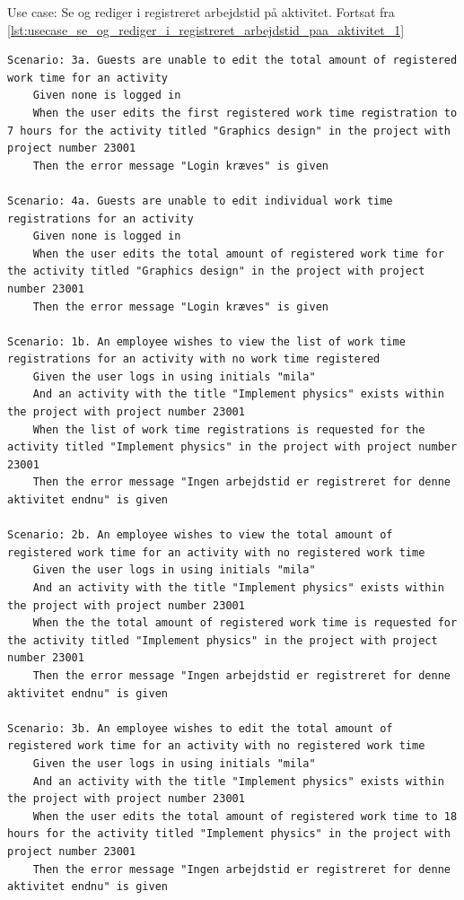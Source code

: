 \begin{listing}[H]
    \caption{Use case: Se og rediger i registreret arbejdstid på aktivitet. Fortsat fra \cref{lst:usecase_se_og_rediger_i_registreret_arbejdstid_paa_aktivitet_1}}\label{lst:usecase_se_og_rediger_i_registreret_arbejdstid_paa_aktivitet_2}
    \begin{verbatim}
Scenario: 3a. Guests are unable to edit the total amount of registered work time for an activity
    Given none is logged in
    When the user edits the first registered work time registration to 7 hours for the activity titled "Graphics design" in the project with project number 23001
    Then the error message "Login kræves" is given

Scenario: 4a. Guests are unable to edit individual work time registrations for an activity
    Given none is logged in
    When the user edits the total amount of registered work time for the activity titled "Graphics design" in the project with project number 23001
    Then the error message "Login kræves" is given

Scenario: 1b. An employee wishes to view the list of work time registrations for an activity with no work time registered
    Given the user logs in using initials "mila"
    And an activity with the title "Implement physics" exists within the project with project number 23001
    When the list of work time registrations is requested for the activity titled "Implement physics" in the project with project number 23001
    Then the error message "Ingen arbejdstid er registreret for denne aktivitet endnu" is given

Scenario: 2b. An employee wishes to view the total amount of registered work time for an activity with no registered work time
    Given the user logs in using initials "mila"
    And an activity with the title "Implement physics" exists within the project with project number 23001
    When the the total amount of registered work time is requested for the activity titled "Implement physics" in the project with project number 23001
    Then the error message "Ingen arbejdstid er registreret for denne aktivitet endnu" is given

Scenario: 3b. An employee wishes to edit the total amount of registered work time for an activity with no registered work time
    Given the user logs in using initials "mila"
    And an activity with the title "Implement physics" exists within the project with project number 23001
    When the user edits the total amount of registered work time to 18 hours for the activity titled "Implement physics" in the project with project number 23001
    Then the error message "Ingen arbejdstid er registreret for denne aktivitet endnu" is given


\end{verbatim}
\end{listing}
